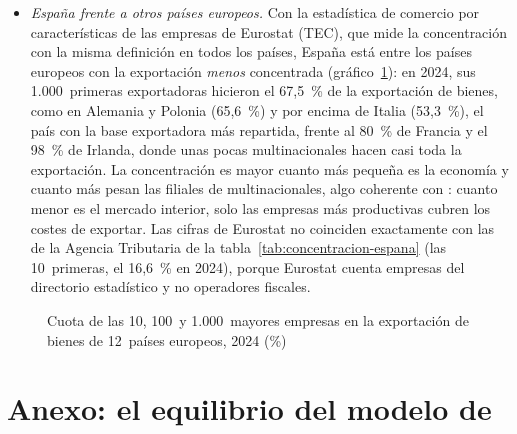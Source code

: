 \documentclass[11pt]{article}
\begin{document}
\begin{itemize}
\item \emph{España frente a otros países europeos.} Con la estadística de comercio por características de las empresas de Eurostat (TEC), que mide la concentración con la misma definición en todos los países, España está entre los países europeos con la exportación \emph{menos} concentrada (gráfico~\ref{fig:concentracion-ue}): en 2024, sus 1.000~primeras exportadoras hicieron el 67,5~\% de la exportación de bienes, como en Alemania y Polonia (65,6~\%) y por encima de Italia (53,3~\%), el país con la base exportadora más repartida, frente al 80~\% de Francia y el 98~\% de Irlanda, donde unas pocas multinacionales hacen casi toda la exportación\nocite{Eurostat2026TEC}. La concentración es mayor cuanto más pequeña es la economía y cuanto más pesan las filiales de multinacionales, algo coherente con : cuanto menor es el mercado interior, solo las empresas más productivas cubren los costes de exportar. Las cifras de Eurostat no coinciden exactamente con las de la Agencia Tributaria de la tabla~\ref{tab:concentracion-espana} (las 10~primeras, el 16,6~\% en 2024), porque Eurostat cuenta empresas del directorio estadístico y no operadores fiscales.
\end{itemize}
\begin{figure}[H]
\centering
\caption{Cuota de las 10, 100~y 1.000~mayores empresas en la exportación de bienes de 12~países europeos, 2024 (\%)}\label{fig:concentracion-ue}
\end{figure}

\section{Anexo: el equilibrio del modelo de }\label{anexo:melitz}
\end{document}
